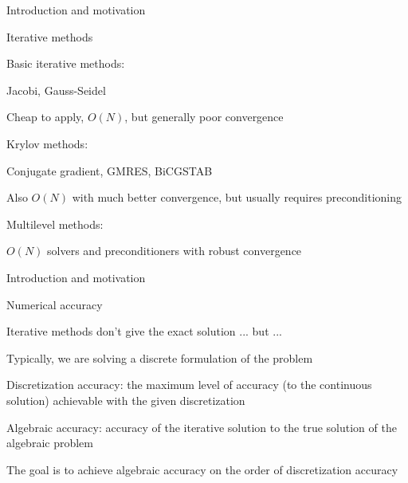 \documentclass[18pt,xcolor=table]{beamer}
\begin{document}
\begin{frame}{Introduction and motivation}
\begin{block}{Iterative methods}
\bit
\item Basic iterative methods:
\bit
\item Jacobi, Gauss-Seidel
\item Cheap to apply, $O(N)$, but generally poor convergence
\eit
\item Krylov methods:
\bit
\item Conjugate gradient, GMRES, BiCGSTAB
\item Also $O(N)$ with much better convergence, but usually requires preconditioning
\eit
\item Multilevel methods:
\bit
\item $O(N)$ solvers and preconditioners with robust convergence 
\eit
\eit
\end{block}
\end{frame}

\begin{frame}{Introduction and motivation}
\begin{block}{Numerical accuracy}
\bit
\item Iterative methods don't give the exact solution ... but ...
\item Typically, we are solving a discrete formulation of the problem
\item Discretization accuracy: the maximum level of accuracy (to the continuous solution) achievable with the given discretization
\item Algebraic accuracy: accuracy of the iterative solution to the true solution of the algebraic problem
\item The goal is to achieve algebraic accuracy on the order of discretization accuracy
\eit
\end{block}
\end{frame}
\end{document}
